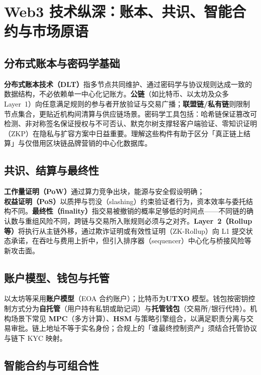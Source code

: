 \chapter{Web3 技术纵深：账本、共识、智能合约与市场原语}

\section{分布式账本与密码学基础}

\textbf{分布式账本技术（DLT）}指多节点共同维护、通过密码学与协议规则达成一致的数据结构，不必依赖单一中心化记账方。\textbf{公链}（如比特币、以太坊及众多 Layer~1）向任意满足规则的参与者开放验证与交易广播；\textbf{联盟链/私有链}则限制节点集合，更贴近机构间清算与供应链场景。密码学工具包括：哈希链保证篡改可检测、非对称签名保证授权与不可否认、默克尔树支撑轻客户端验证、零知识证明（ZKP）在隐私与扩容方案中日益重要。理解这些构件有助于区分「真正链上结算」与仅借用区块链品牌营销的中心化数据库。

\section{共识、结算与最终性}

\textbf{工作量证明（PoW）}通过算力竞争出块，能源与安全假设明确；\textbf{权益证明（PoS）}以质押与罚没（slashing）约束验证者行为，资本效率与委托结构不同。\textbf{最终性（finality）}指交易被撤销的概率足够低的时间点——不同链的确认数与重组风险不同，跨链与交易所入账规则必须与之对齐。\textbf{Layer~2（Rollup 等）}将执行从主链外移，通过欺诈证明或有效性证明（ZK-Rollup）向 L1 提交状态承诺，在吞吐与费用上折中，但引入排序器（sequencer）中心化与桥接风险等新攻击面。

\section{账户模型、钱包与托管}

以太坊等采用\textbf{账户模型}（EOA 合约账户）；比特币为\textbf{UTXO} 模型。钱包按密钥控制方式分为\textbf{自托管}（用户持有私钥或助记词）与\textbf{托管钱包}（交易所/银行代持）。机构场景下常见 \textbf{MPC}（多方计算）、\textbf{HSM} 与策略引擎组合，以满足职责分离与交易审批。链上地址不等于实名身份；合规上的「谁最终控制资产」须结合托管协议与链下 KYC 映射。

\section{智能合约与可组合性}

